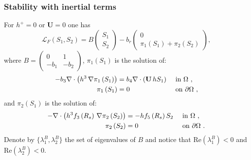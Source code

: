 \documentclass[10pt,aspectratio=169]{beamer}
\newenvironment{nalign}{
	\begin{equation}
	\begin{aligned}
}{
	\end{aligned}
	\end{equation}
	\ignorespacesafterend
}
\begin{document}
\begin{frame}
\frametitle{Stability with inertial terms}\vspace*{0.5cm}
For $h^+=0$ or $\mathbf{U}=0$ one has
\begin{equation}\label{eq:L_F}
\mathcal{L}_F\left(S_1,S_2\right)=B\begin{pmatrix}
S_1\\S_2
\end{pmatrix}-b_r\begin{pmatrix}
0\\\pi_1\left(S_1\right)+\pi_2\left(S_2\right)
\end{pmatrix},
\end{equation}
where $B=\begin{pmatrix}0&1\\-b_1&-b_2
\end{pmatrix}$, $\pi_1(S_1)$ is the solution of:
\begin{nalign}
	-b_3\nabla\cdot \left(h^3 \,\nabla \pi_1\left(S_1\right)\right)&=b_4\nabla\cdot \left(\mathbf{U}\,hS_1\right)&&\textnormal{ in }  \Omega~,\\
	\pi_1\left(S_1\right)&=0 &&\textnormal{ on } \partial \Omega~,
	\label{eq:pi1-triv-case}
\end{nalign}
and $\pi_2(S_1)$ is the solution of:
\begin{nalign}
	-\nabla\cdot \left(h^3f_3\left(R_s\right) \,\nabla \pi_2\left(S_2\right)\right)&=-hf_5\left(R_s\right)S_2&&\textnormal{ in }  \Omega~,\\
	\pi_2\left(S_2\right)&=0 &&\textnormal{ on } \partial \Omega~.
	\label{eq:def:pi2}
\end{nalign}
Denote by $\{\lambda_1^B,\lambda_2^B\}$ the set of eigenvalues of $B$ and notice that $\mbox{Re}\left(\lambda_1^B\right)<0$ and $\mbox{Re}\left(\lambda_2^B\right)<0$.
\end{frame}

\end{document}
